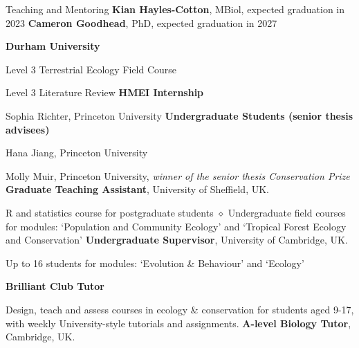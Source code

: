 \begin{rubric}{Teaching and Mentoring}
\entry*[2022-present] \textbf{Kian Hayles-Cotton}, MBiol, expected graduation in 2023
\entry*[2023-present] \textbf{Cameron Goodhead}, PhD, expected graduation in 2027


\entry*[2022-present] \textbf{Durham University}
	\par Level 3 Terrestrial Ecology Field Course
	\par Level 3 Literature Review
\entry*[2021] \textbf{HMEI Internship}
	\par Sophia Richter, Princeton University
\entry*[2019 -- 2021] \textbf{Undergraduate Students (senior thesis advisees)}
	\par Hana Jiang, Princeton University
	\par Molly Muir, Princeton University, \emph{winner of the senior thesis Conservation Prize}
\entry*[2014 -- 2018] \textbf{Graduate Teaching Assistant}, University of Sheffield, UK.
	\par R and statistics course for postgraduate students $\diamond$ Undergraduate field courses for modules: `Population and Community Ecology' and `Tropical Forest Ecology and Conservation'
\entry*[2013 -- 2014] \textbf{Undergraduate Supervisor}, University of Cambridge, UK.
	\par Up to 16 students for modules: `Evolution \& Behaviour' and  `Ecology'


\entry*[2017 -- 2021] \textbf{Brilliant Club Tutor}
	\par Design, teach and assess courses in ecology \& conservation for students aged 9-17, with weekly University-style tutorials and assignments.
\entry*[2013 -- 2014] \textbf{A-level Biology Tutor}, Cambridge, UK.

\end{rubric}
